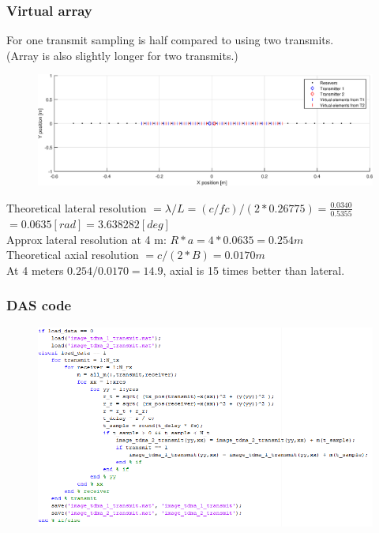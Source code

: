 \documentclass{beamer}
\begin{document}
\begin{frame}
	\frametitle{Virtual array}
	For one transmit sampling is half compared to using two transmits.\\
	(Array is also slightly longer for two transmits.)
	\begin{figure}
    	\includegraphics[scale=0.4]{Arrays.eps}\\	
	\end{figure}
    Theoretical lateral resolution $= \lambda / L = (c/fc) / (2*0.26775) = \frac{0.0340 }{0.		5355}$\\
    $= 0.0635[rad] = 3.638282[deg]$\\
    Approx lateral resolution at 4 m: $R*a = 4 * 0.0635 = 0.254 m$\\
    Theoretical axial resolution $= c / (2*B) = 0.0170 m$\\
    At 4 meters $0.254 / 0.0170 = 14.9$, axial is 15 times better than lateral.
\end{frame}

\begin{frame}[fragile]
	\frametitle{DAS code}
	\begin{figure}
		\includegraphics[scale=0.56]{das_code.png}\\
	\end{figure}
\end{frame}
\end{document}
